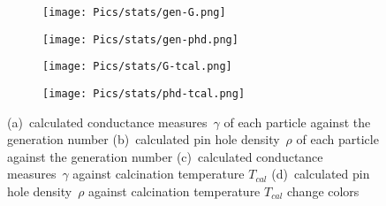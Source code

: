 \begin{figure}[hb]
    \centering
    \begin{subfigure}{.24\textwidth}
        \centering
        \texttt{[image: Pics/stats/gen-G.png]}
        \caption{} \label{fig:emma-G-gen}
    \end{subfigure}
    \begin{subfigure}{.24\textwidth}
        \centering
        \texttt{[image: Pics/stats/gen-phd.png]}
        \caption{} \label{fig:emma-phd-gen}
    \end{subfigure}
    \begin{subfigure}{.24\textwidth}
        \centering
        \texttt{[image: Pics/stats/G-tcal.png]}
        \caption{} \label{fig:g-tcal}
    \end{subfigure}
    \begin{subfigure}{.24\textwidth}
        \centering
        \texttt{[image: Pics/stats/phd-tcal.png]}
        \caption{} \label{fig:phd-tcal}
    \end{subfigure}
	\caption{
		(a)~calculated conductance measures~$\gamma$ of each particle against the generation number %
		(b)~calculated pin hole density~$\rho$ of each particle against the generation number %
		(c)~calculated conductance measures~$\gamma$ against calcination temperature $T_{cal}$
		(d)~calculated pin hole density~$\rho$ against calcination temperature $T_{cal}$
	change colors }

    \label{fig:emma-gen}
\end{figure}

